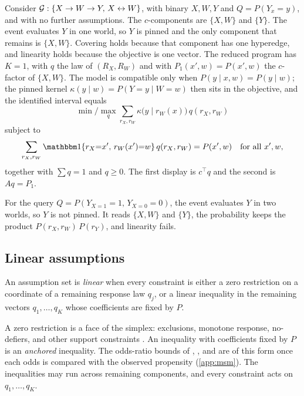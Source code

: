 \begin{example}
  Consider $\mathcal{G}:\{X\to W\to Y,\, X\leftrightarrow W\}$, with binary $X,W,Y$ and $Q=P(Y_x{=}y)$, and with no further assumptions. The $c$-components are $\{X,W\}$ and $\{Y\}$. The event evaluates $Y$ in one world, so $Y$ is pinned and the only component that remains is $\{X,W\}$. Covering holds because that component has one hyperedge, and linearity holds because the objective is one vector. The reduced program has $K=1$, with $q$ the law of $(R_X,R_W)$ and with $P_1(x',w)=P(x',w)$ the $c$-factor of $\{X,W\}$. The model is compatible only when $P(y\mid x,w)=P(y\mid w)$; the pinned kernel $\kappa(y\mid w)=P(Y{=}y\mid W{=}w)$ then sits in the objective, and the identified interval equals
  \begin{equation}
  \min/\max_{q}
  \sum_{r_X,r_W}\kappa\bigl(y\mid r_W(x)\bigr)\,q(r_X,r_W)
  \end{equation}
  subject to
  \begin{equation}
  \sum_{r_X,r_W}
  \I\{r_X{=}x',\,r_W(x'){=}w\}\,q(r_X,r_W)
  =
  P(x',w)
  \quad\text{for all }x',w,
  \end{equation}
  together with $\sum q=1$ and $q\ge 0$. The first display is $c^\top q$ and the second is $Aq=P_1$.

  For the query $Q=P(Y_{X=1}{=}1,\,Y_{X=0}{=}0)$, the event evaluates $Y$ in two worlds, so $Y$ is not pinned. It reads $\{X,W\}$ and $\{Y\}$, the probability keeps the product $P(r_X,r_W)\,P(r_Y)$, and linearity fails.
\end{example}

\subsection{Linear assumptions}
\label{sec:assumptions}

\begin{definition}
\label{def:labels}
An assumption set is \emph{linear} when every constraint is either a zero restriction on a coordinate of a remaining response law $q_j$, or a linear inequality in the remaining vectors $q_1,\ldots,q_K$ whose coefficients are fixed by $P$.
\end{definition}

A zero restriction is a face of the simplex: exclusions, monotone response, no-defiers, and other support constraints \citep{manski1997monotone,imbens1994identification}. An inequality with coefficients fixed by $P$ is an \emph{anchored} inequality. The odds-ratio bounds of \citet{tan2006distributional}, \citet{rosenbaum2002observational}, and \citet{masten2018identification} are of this form once each odds is compared with the observed propensity (\cref{app:msm}). The inequalities may run across remaining components, and every constraint acts on $q_1,\ldots,q_K$.

